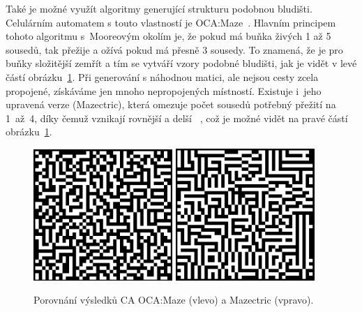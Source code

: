 Také je možné využít algoritmy generující strukturu podobnou bludišti. Celulárním automatem s touto vlastností je OCA:Maze~\cite{OCA:Maze}. Hlavním principem tohoto algoritmu s~Mooreovým okolím je, že pokud má buňka živých 1 až 5 sousedů, tak přežije a ožívá pokud má přesně 3 sousedy. To znamená, že je pro buňky složitější zemřít a tím se vytváří vzory podobné bludišti, jak je vidět v levé částí obrázku~\ref{fig:OCA:Maze}. Při generování s náhodnou matici, ale nejsou cesty zcela propojené, získáváme jen mnoho nepropojených místností. Existuje i~jeho upravená verze (Mazectric), která omezuje počet sousedů potřebný přežití na 1~až~4, díky čemuž vznikají rovnější a delší ~\cite{OCA:Maze}, což je možné vidět na pravé částí obrázku~\ref{fig:OCA:Maze}.
\begin{figure}[H]
    \centering
    \includegraphics[width=0.47\textwidth]{obrazky-figures/ch2/OCA:Maze.png}\hspace{0.5cm}
    \includegraphics[width=0.47\textwidth]{obrazky-figures/ch2/Mazectric.png}
    \caption{Porovnání výsledků CA OCA:Maze (vlevo) a Mazectric (vpravo).}
    \label{fig:OCA:Maze}
\end{figure}
    
